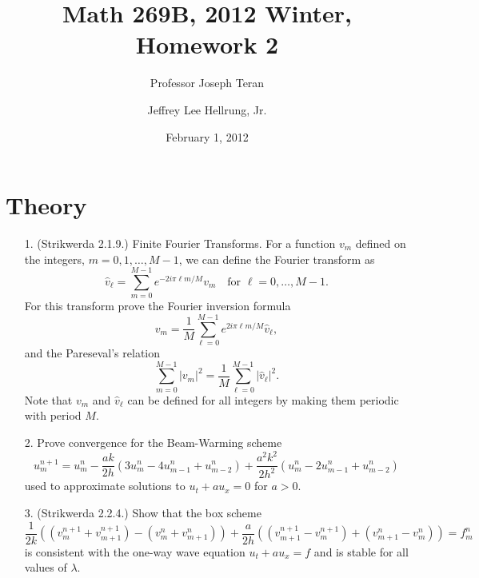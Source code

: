 \documentclass{article}
\providecommand{\abs}[1]{\left\lvert#1\right\rvert}
\begin{document}
\title{Math 269B, 2012 Winter, Homework 2}
\date{February 1, 2012}
\author{Professor Joseph Teran \and Jeffrey Lee Hellrung, Jr.}
\maketitle

\section{Theory}

\begin{itemize}

\item[1.] (Strikwerda 2.1.9.) Finite Fourier Transforms. For a function $v_m$ defined on the integers, $m = 0, 1, \dotsc, M-1$, we can define the Fourier transform as
\begin{equation*}
\hat{v}_{\ell} = \sum_{m=0}^{M-1} e^{-2 i \pi \ell m / M} v_m \quad \text{for } \ell = 0, \dotsc, M-1.
\end{equation*}
For this transform prove the Fourier inversion formula
\begin{equation*}
v_m = \frac{1}{M} \sum_{\ell=0}^{M-1} e^{2 i \pi \ell m / M} \hat{v}_{\ell},
\end{equation*}
and the Pareseval's relation
\begin{equation*}
\sum_{m=0}^{M-1} \abs{v_m}^2 = \frac{1}{M} \sum_{\ell=0}^{M-1} \abs{\hat{v}_{\ell}}^2.
\end{equation*}
Note that $v_m$ and $\hat{v}_{\ell}$ can be defined for all integers by making them periodic with period $M$.

\item[2.] Prove convergence for the Beam-Warming scheme
\begin{equation*}
u^{n+1}_m = u^n_m - \frac{ak}{2h} \left( 3 u^n_m - 4 u^n_{m-1} + u^n_{m-2} \right) + \frac{a^2 k^2}{2h^2} \left( u^n_m - 2 u^n_{m-1} + u^n_{m-2} \right)
\end{equation*}
used to approximate solutions to $u_t + au_x = 0$ for $a > 0$.

\item[3.] (Strikwerda 2.2.4.) Show that the box scheme
\begin{equation*}
\frac{1}{2k} \left( \left( v^{n+1}_m + v^{n+1}_{m+1} \right) - \left( v^n_m + v^n_{m+1} \right) \right) + \frac{a}{2h} \left( \left( v^{n+1}_{m+1} - v^{n+1}_m \right) + \left( v^n_{m+1} - v^n_m \right) \right) = f^n_m
\end{equation*}
is consistent with the one-way wave equation $u_t + au_x = f$ and is stable for all values of $\lambda$.


\end{itemize}
\end{document}
